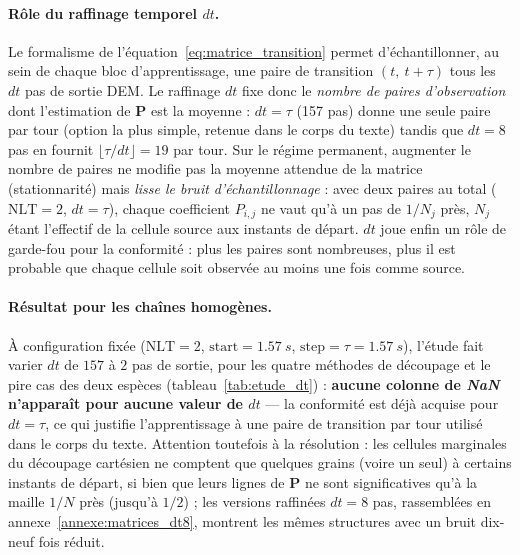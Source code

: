 \documentclass[french]{MemoireMaster}
\begin{document}
\paragraph{Rôle du raffinage temporel $dt$.} Le formalisme de l'équation~\eqref{eq:matrice_transition} permet d'échantillonner, au sein de chaque bloc d'apprentissage, une paire de transition $(t,\ t+\tau)$ tous les $dt$ pas de sortie DEM. Le raffinage $dt$ fixe donc le \emph{nombre de paires d'observation} dont l'estimation de $\mathbf{P}$ est la moyenne : $dt = \tau$ (157 pas) donne une seule paire par tour (option la plus simple, retenue dans le corps du texte) tandis que $dt = 8$ pas en fournit $\lfloor \tau/dt \rfloor = 19$ par tour. Sur le régime permanent, augmenter le nombre de paires ne modifie pas la moyenne attendue de la matrice (stationnarité) mais \emph{lisse le bruit d'échantillonnage} : avec deux paires au total ($\mathrm{NLT} = 2$, $dt = \tau$), chaque coefficient $P_{i,j}$ ne vaut qu'à un pas de $1/N_j$ près, $N_j$ étant l'effectif de la cellule source aux instants de départ. $dt$ joue enfin un rôle de garde-fou pour la conformité : plus les paires sont nombreuses, plus il est probable que chaque cellule soit observée au moins une fois comme source.

\paragraph{Résultat pour les chaînes homogènes.} À configuration fixée ($\mathrm{NLT} = 2$, $\mathrm{start} = \SI{1.57}{s}$, $\mathrm{step} = \tau = \SI{1.57}{s}$), l'étude fait varier $dt$ de $157$ à $2$ pas de sortie, pour les quatre méthodes de découpage et le pire cas des deux espèces (tableau~\ref{tab:etude_dt}) : \textbf{aucune colonne de \textit{NaN} n'apparaît pour aucune valeur de $dt$} --- la conformité est déjà acquise pour $dt = \tau$, ce qui justifie l'apprentissage à une paire de transition par tour utilisé dans le corps du texte. Attention toutefois à la résolution : les cellules marginales du découpage cartésien ne comptent que quelques grains (voire un seul) à certains instants de départ, si bien que leurs lignes de $\mathbf{P}$ ne sont significatives qu'à la maille $1/N$ près (jusqu'à $1/2$) ; les versions raffinées $dt = 8$ pas, rassemblées en annexe~\ref{annexe:matrices_dt8}, montrent les mêmes structures avec un bruit dix-neuf fois réduit.
\end{document}
